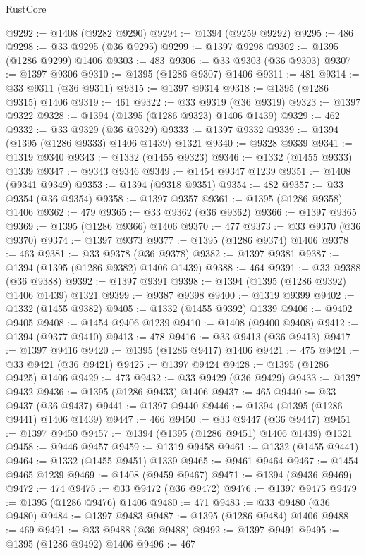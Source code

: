 \begin{lexlean}{RustCore}
\begin{coremodule}
@9292 := @1408 (@9282 @9290)
@9294 := @1394 (@9259 @9292)
@9295 := 486
@9298 := @33 @9295 (@36 @9295)
@9299 := @1397 @9298
@9302 := @1395 (@1286 @9299) @1406
@9303 := 483
@9306 := @33 @9303 (@36 @9303)
@9307 := @1397 @9306
@9310 := @1395 (@1286 @9307) @1406
@9311 := 481
@9314 := @33 @9311 (@36 @9311)
@9315 := @1397 @9314
@9318 := @1395 (@1286 @9315) @1406
@9319 := 461
@9322 := @33 @9319 (@36 @9319)
@9323 := @1397 @9322
@9328 := @1394 (@1395 (@1286 @9323) @1406 @1439)
@9329 := 462
@9332 := @33 @9329 (@36 @9329)
@9333 := @1397 @9332
@9339 := @1394 (@1395 (@1286 @9333) @1406 @1439) @1321
@9340 := @9328 @9339
@9341 := @1319 @9340
@9343 := @1332 (@1455 @9323)
@9346 := @1332 (@1455 @9333) @1339
@9347 := @9343 @9346
@9349 := @1454 @9347 @1239
@9351 := @1408 (@9341 @9349)
@9353 := @1394 (@9318 @9351)
@9354 := 482
@9357 := @33 @9354 (@36 @9354)
@9358 := @1397 @9357
@9361 := @1395 (@1286 @9358) @1406
@9362 := 479
@9365 := @33 @9362 (@36 @9362)
@9366 := @1397 @9365
@9369 := @1395 (@1286 @9366) @1406
@9370 := 477
@9373 := @33 @9370 (@36 @9370)
@9374 := @1397 @9373
@9377 := @1395 (@1286 @9374) @1406
@9378 := 463
@9381 := @33 @9378 (@36 @9378)
@9382 := @1397 @9381
@9387 := @1394 (@1395 (@1286 @9382) @1406 @1439)
@9388 := 464
@9391 := @33 @9388 (@36 @9388)
@9392 := @1397 @9391
@9398 := @1394 (@1395 (@1286 @9392) @1406 @1439) @1321
@9399 := @9387 @9398
@9400 := @1319 @9399
@9402 := @1332 (@1455 @9382)
@9405 := @1332 (@1455 @9392) @1339
@9406 := @9402 @9405
@9408 := @1454 @9406 @1239
@9410 := @1408 (@9400 @9408)
@9412 := @1394 (@9377 @9410)
@9413 := 478
@9416 := @33 @9413 (@36 @9413)
@9417 := @1397 @9416
@9420 := @1395 (@1286 @9417) @1406
@9421 := 475
@9424 := @33 @9421 (@36 @9421)
@9425 := @1397 @9424
@9428 := @1395 (@1286 @9425) @1406
@9429 := 473
@9432 := @33 @9429 (@36 @9429)
@9433 := @1397 @9432
@9436 := @1395 (@1286 @9433) @1406
@9437 := 465
@9440 := @33 @9437 (@36 @9437)
@9441 := @1397 @9440
@9446 := @1394 (@1395 (@1286 @9441) @1406 @1439)
@9447 := 466
@9450 := @33 @9447 (@36 @9447)
@9451 := @1397 @9450
@9457 := @1394 (@1395 (@1286 @9451) @1406 @1439) @1321
@9458 := @9446 @9457
@9459 := @1319 @9458
@9461 := @1332 (@1455 @9441)
@9464 := @1332 (@1455 @9451) @1339
@9465 := @9461 @9464
@9467 := @1454 @9465 @1239
@9469 := @1408 (@9459 @9467)
@9471 := @1394 (@9436 @9469)
@9472 := 474
@9475 := @33 @9472 (@36 @9472)
@9476 := @1397 @9475
@9479 := @1395 (@1286 @9476) @1406
@9480 := 471
@9483 := @33 @9480 (@36 @9480)
@9484 := @1397 @9483
@9487 := @1395 (@1286 @9484) @1406
@9488 := 469
@9491 := @33 @9488 (@36 @9488)
@9492 := @1397 @9491
@9495 := @1395 (@1286 @9492) @1406
@9496 := 467

\end{coremodule}
\end{lexlean}
